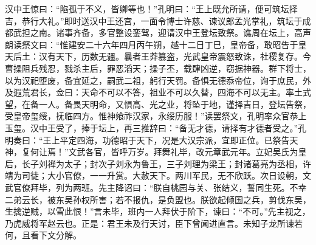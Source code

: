 汉中王惊曰：“陷孤于不义，皆卿等也！”孔明曰：“王上既允所请，便可筑坛择吉，恭行大礼。”即时送汉中王还宫，一面令博士许慈、谏议郎孟光掌礼，筑坛于成都武担之南。诸事齐备，多官整设銮驾，迎请汉中王登坛致祭。谯周在坛上，高声朗读祭文曰：“惟建安二十六年四月丙午朔，越十二日丁巳，皇帝备，敢昭告于皇天后土：汉有天下，历数无疆。曩者王莽篡盗，光武皇帝震怒致诛，社稷复存。今曹操阻兵残忍，戮杀主后，罪恶滔天；操子丕，载肆凶逆，窃据神器。群下将士，以为汉祀堕废，备宜延之，嗣武二祖，躬行天罚。备惧无德忝帝位，询于庶民，外及遐荒君长，佥曰：天命不可以不答，祖业不可以久替，四海不可以无主。率土式望，在备一人。备畏天明命，又惧高、光之业，将坠于地，谨择吉日，登坛告祭，受皇帝玺绶，抚临四方。惟神飨祚汉家，永绥历服！”读罢祭文，孔明率众官恭上玉玺。汉中王受了，捧于坛上，再三推辞曰：“备无才德，请择有才德者受之。”孔明奏曰：“王上平定四海，功德昭于天下，况是大汉宗派，宜即正位。已祭告天神，复何让焉！”文武各官，皆呼万岁。拜舞礼毕，改元章武元年。立妃吴氏为皇后，长子刘禅为太子；封次子刘永为鲁王，三子刘理为梁王；封诸葛亮为丞相，许靖为司徒；大小官僚，一一升赏。大赦天下。两川军民，无不欣跃。次日设朝，文武官僚拜毕，列为两班。先主降诏曰：“朕自桃园与关、张结义，誓同生死。不幸二弟云长，被东吴孙权所害；若不报仇，是负盟也。朕欲起倾国之兵，剪伐东吴，生擒逆贼，以雪此恨！”言未毕，班内一人拜伏于阶下，谏曰：“不可。”先主视之，乃虎威将军赵云也。正是：君王未及行天讨，臣下曾闻进直言。未知子龙所谏若何，且看下文分解。